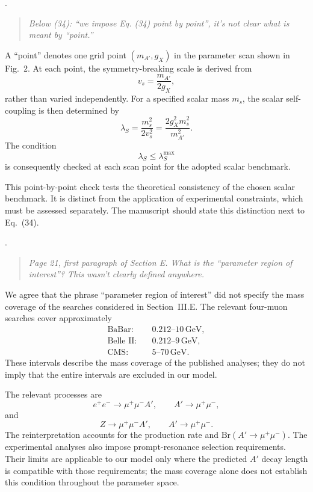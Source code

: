 \documentclass[12pt,a4paper]{article}
\begin{document}
\medskip
{}. \begin{quote}\itshape
Below (34): ``we impose Eq. (34) point by point'', it's not clear what is meant by ``point.''
\end{quote}

A ``point'' denotes one grid point \((m_{A'},g_X)\) in the parameter scan shown in Fig.~2. At each point, the symmetry-breaking scale is derived from
\[
v_s=\frac{m_{A'}}{2g_X},
\]
rather than varied independently. For a specified scalar mass \(m_s\), the scalar self-coupling is then determined by
\[
\lambda_S
=\frac{m_s^2}{2v_s^2}
=\frac{2g_X^2m_s^2}{m_{A'}^2}.
\]
The condition
\[
\lambda_S\leq\lambda_S^{\max}
\]
is consequently checked at each scan point for the adopted scalar benchmark.

This point-by-point check tests the theoretical consistency of the chosen scalar benchmark. It is distinct from the application of experimental constraints, which must be assessed separately. The manuscript should state this distinction next to Eq.~(34).

\medskip
{}. \begin{quote}\itshape
Page 21, first paragraph of Section E. What is the ``parameter region of interest''? This wasn't clearly defined anywhere.
\end{quote}

We agree that the phrase ``parameter region of interest'' did not specify the mass coverage of the searches considered in Section~III.E. The relevant four-muon searches cover approximately
\[
\begin{aligned}
\text{BaBar}:&\quad 0.212\text{--}10\,\mathrm{GeV},\\
\text{Belle II}:&\quad 0.212\text{--}9\,\mathrm{GeV},\\
\text{CMS}:&\quad 5\text{--}70\,\mathrm{GeV}.
\end{aligned}
\]
These intervals describe the mass coverage of the published analyses; they do not imply that the entire intervals are excluded in our model.

The relevant processes are
\[
e^+e^-\to\mu^+\mu^-A',
\qquad A'\to\mu^+\mu^-,
\]
and
\[
Z\to\mu^+\mu^-A',
\qquad A'\to\mu^+\mu^-.
\]
The reinterpretation accounts for the production rate and \(\mathrm{Br}(A'\to\mu^+\mu^-)\). The experimental analyses also impose prompt-resonance selection requirements. Their limits are applicable to our model only where the predicted \(A'\) decay length is compatible with those requirements; the mass coverage alone does not establish this condition throughout the parameter space.
\end{document}
